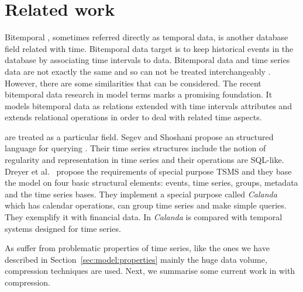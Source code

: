 

\section{Related work}
\label{sec:related-work}



Bitemporal , sometimes referred directly as temporal data,
is another database field related with time. Bitemporal data target is
to keep historical events in the database by associating time
intervals to data.  Bitemporal data and time series data are not
exactly the same and so can not be treated interchangeably
\cite{schmidt95}. However, there are some similarities that can be
considered.  The recent bitemporal data research in  model
terms \cite{jensen99:temporaldata,date02:_tempor_data_relat_model}
marks a promising foundation. It models bitemporal data as relations
extended with time intervals attributes and extends relational
operations in order to deal with related time aspects.

 are treated as a particular  field.  Segev and
Shoshani \cite{segev87:sigmod} propose an structured language for
querying . Their time series structures include the notion
of regularity and representation in time series and their operations
are SQL-like.  Dreyer et al.\ \cite{dreyer94} propose the requirements
of special purpose TSMS and they base the model on four basic
structural elements: events, time series, groups, metadata and the
time series bases. They implement a special purpose  called
\emph{Calanda} which has calendar operations, can group time series
and make simple queries. They exemplify it with financial data. In
\cite{schmidt95} \emph{Calanda} is compared with temporal systems
designed for time series.




As  suffer from problematic properties of time
series, like the ones we have described in
Section~\ref{sec:model:properties} mainly the huge data volume,
compression techniques are used.  Next, we summarise some current work
in  with compression.



